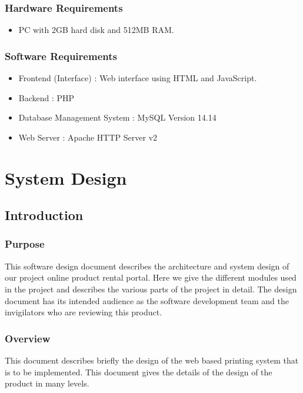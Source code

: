 \documentclass[11pt]{report}
\begin{document}
\subsection{Hardware Requirements}
\begin{itemize}
  \item PC with 2GB hard disk and 512MB RAM.
\end{itemize}

\subsection{Software Requirements}
\begin{itemize}
  \item Frontend (Interface) : Web interface using HTML and JavaScript.
  \item Backend : PHP
  \item Database Management System : MySQL Version 14.14
  \item Web Server : Apache HTTP Server v2
\end{itemize}

  
\chapter{System Design}
\label{xx}
 




\section{Introduction}
\subsection{Purpose}

This software design document describes the architecture and system design of our project online product rental portal. Here we give the different modules used in the project and describes the various parts of the project in detail. The design document has its intended audience as the software development team and the invigilators who are reviewing this product.
\subsection{Overview}
This document describes briefly the design of the web based printing system that is to be implemented. This document gives the details of the design of the product in many levels.
\end{document}
